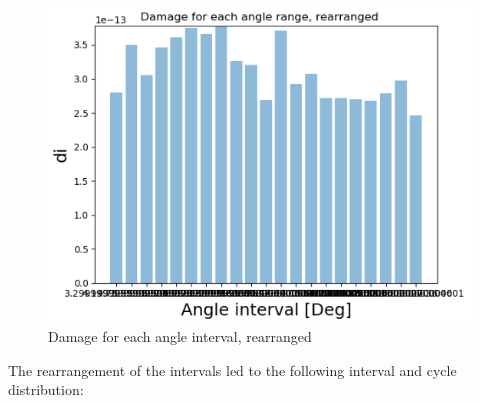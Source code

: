 \begin{figure}[H]
\centering
\includegraphics[scale=0.8]{figures/dire}
\caption[Damage for each angle interval, rearranged]{Damage for each angle interval, rearranged}
 \label{fig:dire}
\end{figure}

The rearrangement of the intervals led to the following interval and cycle distribution:

